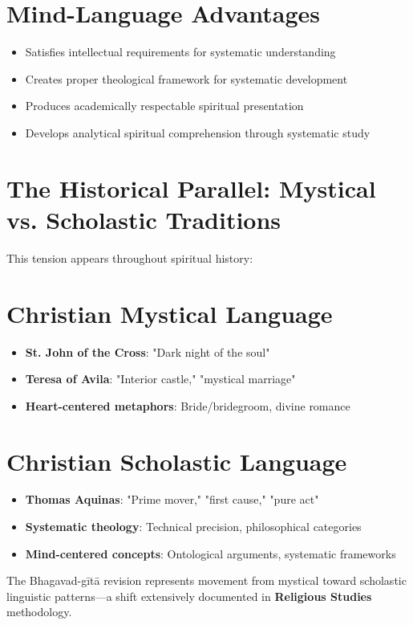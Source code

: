 \documentclass[11pt,twoside]{book}
\begin{document}
\section*{Mind-Language Advantages}
\label{sec:org5250613}
\begin{itemize}
\item Satisfies intellectual requirements for systematic understanding
\item Creates proper theological framework for systematic development
\item Produces academically respectable spiritual presentation
\item Develops analytical spiritual comprehension through systematic study
\end{itemize}
\section*{The Historical Parallel: Mystical vs. Scholastic Traditions}
\label{sec:org56c8388}

This tension appears throughout spiritual history:
\section*{Christian Mystical Language}
\label{sec:org4c123a0}
\begin{itemize}
\item \textbf{\textbf{St. John of the Cross}}: "Dark night of the soul"
\item \textbf{\textbf{Teresa of Avila}}: "Interior castle," "mystical marriage"
\item \textbf{\textbf{Heart-centered metaphors}}: Bride/bridegroom, divine romance
\end{itemize}
\section*{Christian Scholastic Language}
\label{sec:org4c03eb0}
\begin{itemize}
\item \textbf{\textbf{Thomas Aquinas}}: "Prime mover," "first cause," "pure act"
\item \textbf{\textbf{Systematic theology}}: Technical precision, philosophical categories
\item \textbf{\textbf{Mind-centered concepts}}: Ontological arguments, systematic frameworks
\end{itemize}

The Bhagavad-gītā revision represents movement from mystical toward scholastic linguistic patterns—a shift extensively documented in \textbf{\textbf{Religious Studies}} methodology.
\end{document}
